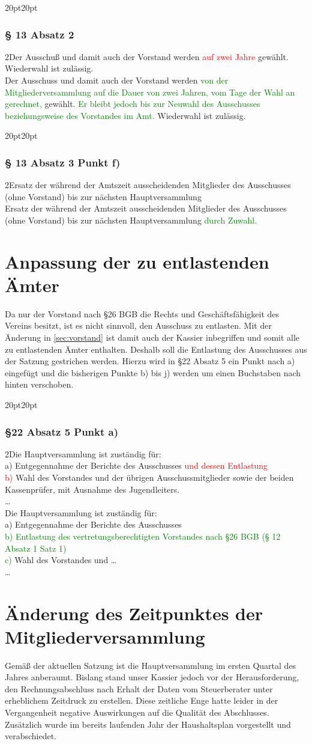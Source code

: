 \documentclass[10pt,a4paper,parskip=half]{scrartcl}
\newcommand{\new}[1]{\textcolor{Green}{#1}}
\newcommand{\old}[1]{\textcolor{Red}{#1}}
\newcommand{\change}[1]{
  \begin{adjustwidth}{20pt}{20pt}
    #1
  \end{adjustwidth}
}
\newcommand{\compare}[3]{\change{\subsubsection*{#1}\begin{multicols}{2}#2\columnbreak\\#3\end{multicols}}}
\begin{document}
  \compare{§ 13 Absatz 2}{Der Ausschuß und damit auch der Vorstand werden \old{auf zwei Jahre} gewählt. Wiederwahl ist zulässig.}{Der Ausschuss und damit auch der Vorstand werden \new{von der Mitgliederversammlung auf die Dauer von zwei Jahren,
  vom Tage der Wahl an gerechnet,} gewählt. \new{Er bleibt jedoch bis zur Neuwahl des Ausschusses beziehungsweise des Vorstandes im Amt.}
  Wiederwahl ist zulässig.}
  
  \compare{§ 13 Absatz 3 Punkt f)}{Ersatz der während der Amtszeit ausscheidenden Mitglieder des Ausschusses (ohne Vorstand) bis zur nächsten Hauptversammlung}{Ersatz der während der Amtszeit ausscheidenden Mitglieder des Ausschusses (ohne Vorstand) bis zur nächsten Hauptversammlung \new{durch Zuwahl.}}

  \section{Anpassung der zu entlastenden Ämter}
  Da nur der Vorstand nach §26 BGB die Rechts und Geschäftsfähigkeit des Vereins besitzt, ist es nicht sinnvoll, den Ausschuss zu entlasten. Mit der Änderung in \autoref*{sec:vorstand} ist damit auch der Kassier inbegriffen und somit alle zu entlastenden Ämter enthalten. Deshalb soll die Entlastung des Ausschusses aus der Satzung gestrichen werden. Hierzu wird in §22 Absatz 5 ein Punkt nach a) eingefügt und die bisherigen Punkte b) bis j) werden um einen Buchstaben nach hinten verschoben.

  \compare{§22 Absatz 5 Punkt a)}
  {Die Hauptversammlung ist zuständig für: \\a) Entgegennahme der Berichte des Ausschusses \old{und dessen Entlastung}\\
  \old{b)} Wahl des Vorstandes und der übrigen Ausschussmitglieder sowie der beiden Kassenprüfer, mit Ausnahme des Jugendleiters.\\\dots}
  {Die Hauptversammlung ist zuständig für: \\a) Entgegennahme der Berichte des Ausschusses\\
  \new{b) Entlastung des vertretungsberechtigten Vorstandes nach §26 BGB (§ 12 Absatz 1 Satz 1)}\\
  \new{c)} Wahl des Vorstandes und \dots \\\dots}
  
  \section{Änderung des Zeitpunktes der Mitgliederversammlung}
  Gemäß der aktuellen Satzung ist die Hauptversammlung im ersten Quartal des Jahres anberaumt. Bislang stand unser Kassier jedoch vor der Herausforderung, den Rechnungsabschluss nach Erhalt der Daten vom Steuerberater unter erheblichem Zeitdruck zu erstellen. Diese zeitliche Enge hatte leider in der Vergangenheit negative Auswirkungen auf die Qualität des Abschlusses. Zusätzlich wurde im bereits laufenden Jahr der Haushaltsplan vorgestellt und verabschiedet.
  
\end{document}

